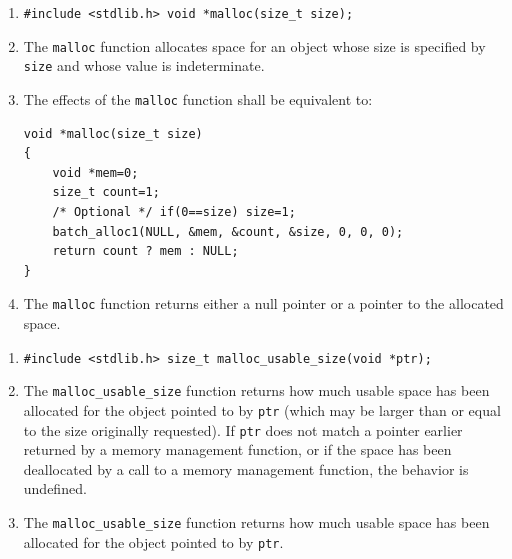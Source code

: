 \documentclass[wd]{isov2}
\begin{document}
{
\begin{enumerate}
\renewcommand{\theenumi}{\arabic{enumi}}
\item \texttt{\#include <stdlib.h>\linebreak
void *malloc(size\_t size);}
\item The \texttt{malloc} function allocates space for an object whose size is specified by \texttt{size} and whose value is indeterminate.
\color{changed}
\item The effects of the \texttt{malloc} function shall be equivalent to:
\begin{verbatim}
void *malloc(size_t size)
{
    void *mem=0;
    size_t count=1;
    /* Optional */ if(0==size) size=1;
    batch_alloc1(NULL, &mem, &count, &size, 0, 0, 0);
    return count ? mem : NULL;
}
\end{verbatim}
\color{black}
\item The \texttt{malloc} function returns either a null pointer or a pointer to the allocated space.
\end{enumerate}

\color{changed}
\begin{enumerate}
\renewcommand{\theenumi}{\arabic{enumi}}
\item \texttt{\#include <stdlib.h>\linebreak
size\_t malloc\_usable\_size(void *ptr);}
\item The \texttt{malloc\_usable\_size} function returns how much usable space has been allocated for the object pointed to by \texttt{ptr} (which may be larger than or equal to the size originally requested). If \texttt{ptr} does not match a pointer earlier returned by a memory management function, or if the space has been deallocated by a call to a memory management function, the behavior is undefined.
\item The \texttt{malloc\_usable\_size} function returns how much usable space has been allocated for the object pointed to by \texttt{ptr}.
\end{enumerate}
\color{black}

}
\end{document}
